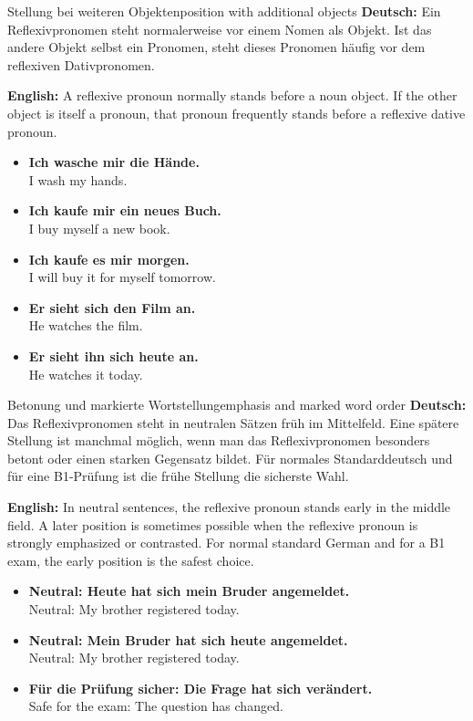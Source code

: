 \documentclass[a4paper,11pt]{article}
\newcommand{\GermanText}[1]{\textbf{Deutsch: }#1\par}
\newcommand{\EnglishText}[1]{{\small\color{SoftGray}\textbf{English: }#1\par}}
\newcommand{\ExampleItem}[2]{\item \textbf{#1}\\{\small\color{SoftGray}#2}}
\begin{document}
        \begin{grammarentry}{Stellung bei weiteren Objekten}{position with additional objects}
            \GermanText{Ein Reflexivpronomen steht normalerweise vor einem Nomen als Objekt. Ist das andere Objekt selbst ein Pronomen, steht dieses Pronomen häufig vor dem reflexiven Dativpronomen.}
            \EnglishText{A reflexive pronoun normally stands before a noun object. If the other object is itself a pronoun, that pronoun frequently stands before a reflexive dative pronoun.}

            \begin{exbox}
                \begin{itemize}
                    \ExampleItem{Ich wasche mir die Hände.}{I wash my hands.}
                    \ExampleItem{Ich kaufe mir ein neues Buch.}{I buy myself a new book.}
                    \ExampleItem{Ich kaufe es mir morgen.}{I will buy it for myself tomorrow.}
                    \ExampleItem{Er sieht sich den Film an.}{He watches the film.}
                    \ExampleItem{Er sieht ihn sich heute an.}{He watches it today.}
                \end{itemize}
            \end{exbox}
        \end{grammarentry}

        \begin{grammarentry}{Betonung und markierte Wortstellung}{emphasis and marked word order}
            \GermanText{Das Reflexivpronomen steht in neutralen Sätzen früh im Mittelfeld. Eine spätere Stellung ist manchmal möglich, wenn man das Reflexivpronomen besonders betont oder einen starken Gegensatz bildet. Für normales Standarddeutsch und für eine B1-Prüfung ist die frühe Stellung die sicherste Wahl.}
            \EnglishText{In neutral sentences, the reflexive pronoun stands early in the middle field. A later position is sometimes possible when the reflexive pronoun is strongly emphasized or contrasted. For normal standard German and for a B1 exam, the early position is the safest choice.}

            \begin{exbox}
                \begin{itemize}
                    \ExampleItem{Neutral: Heute hat sich mein Bruder angemeldet.}{Neutral: My brother registered today.}
                    \ExampleItem{Neutral: Mein Bruder hat sich heute angemeldet.}{Neutral: My brother registered today.}
                    \ExampleItem{Für die Prüfung sicher: Die Frage hat sich verändert.}{Safe for the exam: The question has changed.}
                \end{itemize}
            \end{exbox}
        \end{grammarentry}
\end{document}
